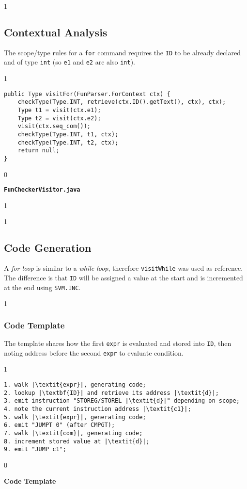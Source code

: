 \documentclass{article}
\newcommand{\code}[1]{\texttt{#1}}
\newenvironment{codelst}{\captionsetup{type=listing}}{}
\newcommand{\dividestages}{0}
\newcommand{\showcontextcode}{1}
\newcommand{\showtemplate}{0}
\newcommand{\npage}{
    \if\dividestages1
        \newpage
    \fi
}
\newcommand{\stage}[1]{
    \if\dividestages1
        \vspace{0.5cm}
        \subsection{#1}
    \fi
}
\newcommand{\act}[1]{
    \if\dividestages1
        \subsubsection{#1}
    \fi
}
\newcommand{\codecaption}[1]{
    \if\dividestages0
        \vspace{-0.75cm}
        \caption{\textbf{#1}}
        \vspace{0.4cm}
    \fi
}
\begin{document}

\stage{Contextual Analysis}

\noindent The scope/type rules for a \code{for} command requires the \code{ID} to be already declared and of type \code{int} (so \code{e1} and \code{e2} are also \code{int}).

\if\showcontextcode1

\begin{codelst}
\begin{verbatim}
public Type visitFor(FunParser.ForContext ctx) {
	checkType(Type.INT, retrieve(ctx.ID().getText(), ctx), ctx);
	Type t1 = visit(ctx.e1);
	Type t2 = visit(ctx.e2);
	visit(ctx.seq_com());
	checkType(Type.INT, t1, ctx);
	checkType(Type.INT, t2, ctx);
	return null;
}
\end{verbatim}
\codecaption{\code{FunCheckerVisitor.java}}
\end{codelst}

\npage

\fi


\stage{Code Generation}

\noindent A \textit{for-loop} is similar to a \textit{while-loop}, therefore \code{visitWhile} was used as reference. The difference is that \code{ID} will be assigned a value at the start and is incremented at the end using \code{SVM.INC}.

\act{Code Template}

\vspace{0.5cm}

\noindent The template shares how the first \code{expr} is evaluated and stored into \code{ID}, then noting address before the second \code{expr} to evaluate condition.

\if\showtemplate1

\vspace{0.5cm}

\begin{codelst}
\begin{verbatim}
1. walk |\textit{expr}|, generating code;
2. lookup |\textbf{ID}| and retrieve its address |\textit{d}|;
3. emit instruction "STOREG/STOREL |\textit{d}|" depending on scope;
4. note the current instruction address |\textit{c1}|;
5. walk |\textit{expr}|, generating code;
6. emit "JUMPT 0" (after CMPGT);
7. walk |\textit{com}|, generating code;
8. increment stored value at |\textit{d}|;
9. emit "JUMP c1";
\end{verbatim}
\codecaption{Code Template}
\end{codelst}
\end{document}
